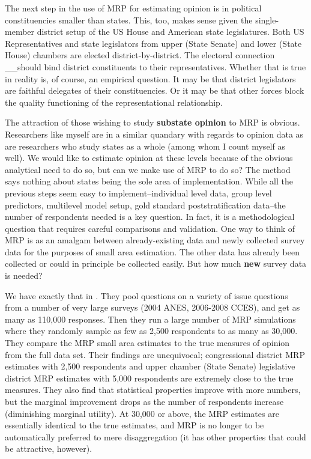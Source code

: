 \documentclass[
  oneside]{book}
\begin{document}
The next step in the use of MRP for estimating opinion is in political constituencies smaller than states. This, too, makes sense given the single-member district setup of the US House and American state legislatures. Both US Representatives and state legislators from upper (State Senate) and lower (State House) chambers are elected district-by-district. The electoral connection \citet{Mayhew:1974} \_\_should bind district constituents to their representatives. Whether that is true in reality is, of course, an empirical question. It may be that district legislators are faithful delegates of their constituencies. Or it may be that other forces block the quality functioning of the representational relationship.

The attraction of those wishing to study \textbf{substate opinion} to MRP is obvious. Researchers like myself are in a similar quandary with regards to opinion data as are researchers who study states as a whole (among whom I count myself as well). We would like to estimate opinion at these levels because of the obvious analytical need to do so, but can we make use of MRP to do so? The method says nothing about states being the sole area of implementation. While all the previous steps seem easy to implement--individual level data, group level predictors, multilevel model setup, gold standard poststratification data--the number of respondents needed is a key question. In fact, it is a methodological question that requires careful comparisons and validation. One way to think of MRP is as an amalgam between already-existing data and newly collected survey data for the purposes of small area estimation. The other data has already been collected or could in principle be collected easily. But how much \textbf{new} survey data is needed?

We have exactly that in \citet{Warshaw:2012}. They pool questions on a variety of issue questions from a number of very large surveys (2004 ANES, 2006-2008 CCES), and get as many as 110,000 responses. Then they run a large number of MRP simulations where they randomly sample as few as 2,500 respondents to as many as 30,000. They compare the MRP small area estimates to the true measures of opinion from the full data set. Their findings are unequivocal; congressional district MRP estimates with 2,500 respondents and upper chamber (State Senate) legislative district MRP estimates with 5,000 respondents are extremely close to the true measures. They also find that statistical properties improve with more numbers, but the marginal improvement drops as the number of respondents increase (diminishing marginal utility). At 30,000 or above, the MRP estimates are essentially identical to the true estimates, and MRP is no longer to be automatically preferred to mere disaggregation (it has other properties that could be attractive, however).
\end{document}
